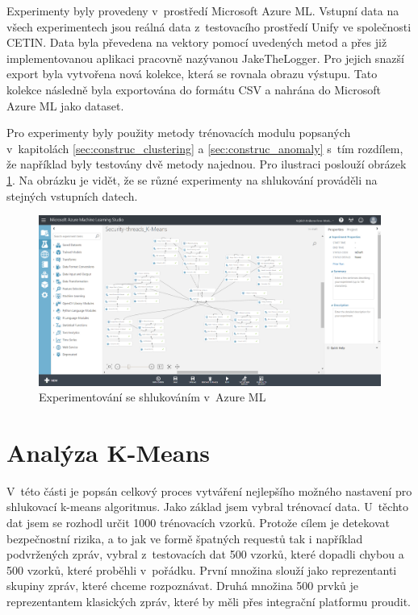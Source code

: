 \documentclass[thesis=M,czech]{FITthesis}[2012/10/20]
\newcommand{\tmpframe}[1]{\fbox{#1}}
\renewcommand{\tmpframe}[1]{#1}
\begin{document}
	Experimenty byly provedeny v~prostředí Microsoft Azure ML. Vstupní data na všech experimentech jsou reálná data z~testovacího prostředí Unify ve společnosti CETIN. Data byla převedena na vektory pomocí uvedených metod a přes již implementovanou aplikaci pracovně nazývanou JakeTheLogger. Pro jejich snazší export byla vytvořena nová kolekce, která se rovnala obrazu výstupu. Tato kolekce následně byla exportována do formátu CSV a nahrána do Microsoft Azure ML jako dataset.
	
	Pro experimenty byly použity metody trénovacích modulu popsaných v~kapitolách \ref{sec:construc_clustering} a \ref{sec:construc_anomaly} s~tím rozdílem, že například byly testovány dvě metody najednou. Pro ilustraci poslouží obrázek \ref{fig:azure-experiment}. Na obrázku je vidět, že se různé experimenty na shlukování prováděli na stejných vstupních datech. 
	
	\begin{figure}[htb]\centering
		\tmpframe{\includegraphics[width=\textwidth]{./img/MSAzureExperimentKMeans}}	
		\caption{Experimentování se shlukováním v~Azure ML}
		\label{fig:azure-experiment}
	\end{figure}
	
	\section{Analýza K-Means}
		V~této části je popsán celkový proces vytváření nejlepšího možného nastavení pro shlukovací k-means algoritmus. Jako základ jsem vybral trénovací data. U~těchto dat jsem se rozhodl určit 1000 trénovacích vzorků. Protože cílem je detekovat bezpečnostní rizika, a to jak ve formě špatných requestů tak i například podvržených zpráv, vybral z~testovacích dat 500 vzorků, které dopadli chybou a 500 vzorků, které proběhli v~pořádku. První množina slouží jako reprezentanti skupiny zpráv, které chceme rozpoznávat. Druhá množina 500 prvků je reprezentantem klasických zpráv, které by měli přes integrační platformu proudit.
		
\end{document}
